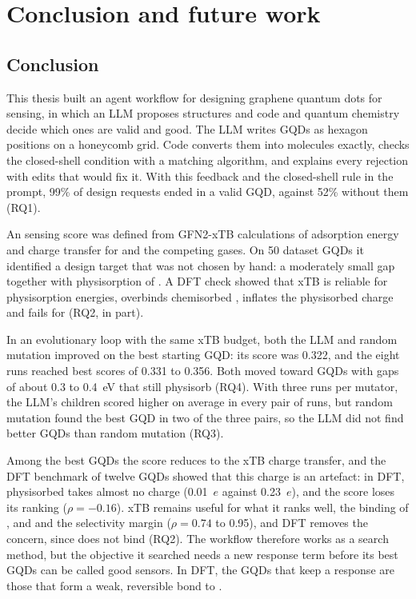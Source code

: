 \chapter{Conclusion and future work}
\label{ch:conclusion}

\section{Conclusion}

This thesis built an agent workflow for designing graphene quantum dots for  sensing, in
which an LLM proposes structures and code and quantum chemistry decide which ones are valid and
good. The LLM writes GQDs as hexagon positions on a honeycomb grid. Code converts them into
molecules exactly, checks the closed-shell condition with a matching algorithm, and explains every
rejection with edits that would fix it. With this feedback and the closed-shell rule in the prompt,
99\% of design requests ended in a valid GQD, against 52\% without them (RQ1).

An  sensing score was defined from GFN2-xTB calculations of adsorption energy and charge
transfer for  and the competing gases. On 50 dataset GQDs it identified a design target that
was not chosen by hand: a moderately small gap together with physisorption of . A DFT check
showed that xTB is reliable for physisorption energies, overbinds chemisorbed , inflates
the physisorbed charge and fails for  (RQ2, in part).

In an evolutionary loop with the same xTB budget, both the LLM and random mutation improved on the
best starting GQD: its score was 0.322, and the eight runs reached best scores of 0.331 to 0.356.
Both moved toward GQDs with gaps of about 0.3 to 0.4~eV that still physisorb  (RQ4). With
three runs per mutator, the LLM's children scored higher on average in every pair of runs, but
random mutation found the best GQD in two of the three pairs, so the LLM did not find better GQDs
than random mutation (RQ3).

Among the best GQDs the score reduces to the xTB charge transfer, and the DFT benchmark of twelve
GQDs showed that this charge is an artefact: in DFT, physisorbed  takes almost no charge
(0.01~\(e\) against 0.23~\(e\)), and the score loses its ranking (\(\rho = -0.16\)). xTB remains
useful for what it ranks well, the binding of ,  and  and the selectivity
margin (\(\rho = 0.74\) to 0.95), and DFT removes the  concern, since  does not bind
(RQ2). The workflow therefore works as a search method, but the objective it searched needs a new
response term before its best GQDs can be called good sensors. In DFT, the GQDs that keep a
response are those that form a weak, reversible bond to .

